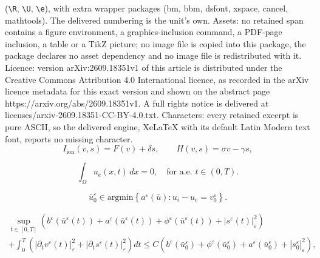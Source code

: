 \documentclass[10pt,a4paper]{amsart}
\newcommand{\e}{\varepsilon}
\begin{document}
(\texttt{\textbackslash R}, \texttt{\textbackslash U}, \texttt{\textbackslash e}), with extra wrapper packages (bm, bbm, dsfont, xspace, cancel, mathtools). The delivered numbering is the unit's own. Assets: no retained span contains a figure environment, a graphics-inclusion command, a PDF-page inclusion, a table or a TikZ picture; no image file is copied into this package, the package declares no asset dependency and no image file is redistributed with it. Licence: version arXiv:2609.18351v1 of this article is distributed under the Creative Commons Attribution 4.0 International licence, as recorded in the arXiv licence metadata for this exact version and shown on the abstract page https://arxiv.org/abs/2609.18351v1. A full rights notice is delivered at licenses/arxiv-2609.18351-CC-BY-4.0.txt. Characters: every retained excerpt is pure ASCII, so the delivered engine, XeLaTeX with its default Latin Modern text font, reports no missing character.
\begin{equation}
	\label{eq:FHN}
	I_{\text{ion}}(v, s) = F(v)+ \delta s, \qquad H(v,s) = \sigma v-\gamma s,
\end{equation}

\begin{equation}
	\label{eq:zeromean}
	\int_{\Omega} u_e(x, t) \, dx = 0, \quad \text{for a.e. } t \in (0,T).
\end{equation}

\begin{equation}
	\label{eq:compatibility}
	\bar u_0^\e \in \text{argmin}\left\{ a^\e(\bar u): u_i-u_e = v_0^\e\right\}. 
\end{equation}

	\begin{equation}
		\label{apriori-estimate}
		\begin{aligned}
			\sup_{t \in [0,T]} \left( b^\e(\bar{u}^\e(t)) + a^\e(\bar{u}^\e(t)) +\phi^\e(\bar{u}^\e(t)) +  |s^\e(t)|^2_\e  \right) 
			\hspace{4cm} \\
			+ \int_0^T \left( |\partial_t v^\e(t)|_\e^2 + |\partial_t s^\e(t)|_\e^2 \right) dt 
			\leq C \left( b^\e(\bar{u}_0^\e) + \phi^\e(\bar{u}_0^\e) + a^\e(\bar{u}_0^\e) +|s_0^\e|^2_\e \right),
		\end{aligned}
	\end{equation}
\end{document}
